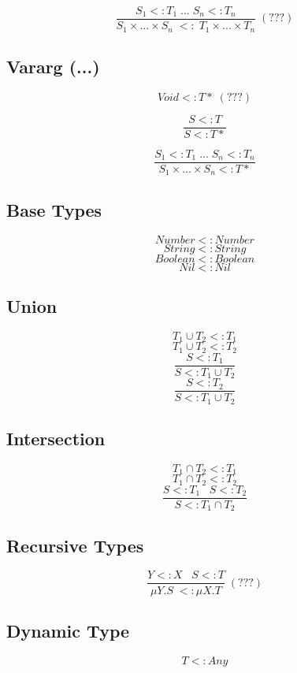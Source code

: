 \documentclass[12pt]{article}
\begin{document}
\[
\frac{S_{1} <: T_{1} \; ... \; S_{n} <: T_{n}}
     {S_{1} \times ... \times S_{n} \; <: \; T_{1} \times ... \times T_{n}} \; (???)
\]

\subsection{Vararg (...)}

\[
Void <: {T*} \; (???)
\]

\[
\frac{S <: T}
     {S <: {T*}}
\]

\[
\frac{S_{1} <: T_{1} \; ... \; S_{n} <: T_{n}}
     {S_{1} \times ... \times S_{n} <: {T*}}
\]

\subsection{Base Types}

\[
Number <: Number
\]
\[
String <: String
\]
\[
Boolean <: Boolean
\]
\[
Nil <: Nil
\]

\subsection{Union}

\[
T_{1} \cup T_{2} <: T_{1}
\]
\[
T_{1} \cup T_{2} <: T_{2}
\]
\[
\frac{S <: T_{1}}
     {S <: T_{1} \cup T_{2}}
\]
\[
\frac{S <: T_{2}}
     {S <: T_{1} \cup T_{2}}
\]

\subsection{Intersection}

\[
T_{1} \cap T_{2} <: T_{1}
\]
\[
T_{1} \cap T_{2} <: T_{2}
\]
\[
\frac{S <: T_{1} \;\;\; S <: T_{2}}
     {S <: T_{1} \cap T_{2}}
\]

\subsection{Recursive Types}

\[
\frac{Y <: X \;\;\; S <: T}
     {\mu Y.S \; <: \mu X.T} \; (???)
\]

\subsection{Dynamic Type}

\[
T <: Any
\]
\end{document}
